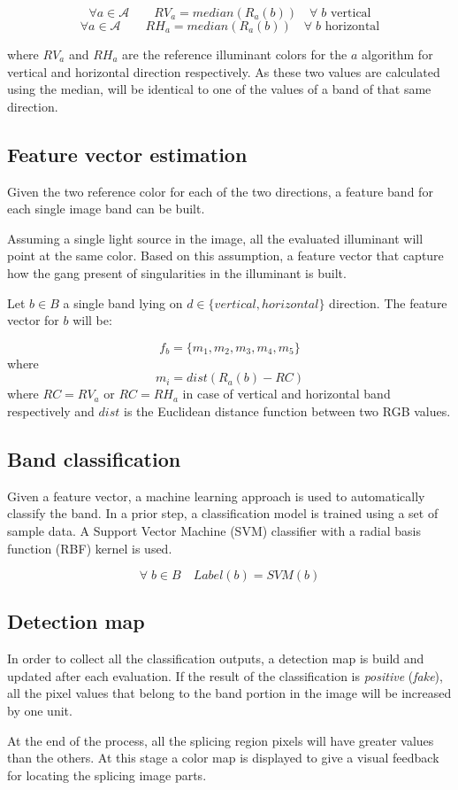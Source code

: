 $$
\forall a \in \mathcal{A} \qquad RV_a = median(R_a(b)) \quad \forall \; b \textrm{ vertical}
$$
$$
\forall a \in \mathcal{A} \qquad RH_a = median(R_a(b)) \quad \forall \; b \textrm{ horizontal}
$$

where $RV_a$ and $RH_a$ are the reference illuminant colors for the $a$ algorithm for vertical and horizontal direction respectively. As these two values are calculated using the median, will be identical to one of the values of a band of that same direction.

\subsection{Feature vector estimation}

Given the two reference color for each of the two directions, a feature band for each single image band can be built.

Assuming a single light source in the image, all the evaluated illuminant will point at the same color.
Based on this assumption, a feature vector that capture how the gang present of singularities in the illuminant is built.

Let $b \in B$ a single band lying on $d \in \{vertical, horizontal\}$ direction. The feature vector for $b$ will be:

\begin{equation}\label{eq:regionsfeaturevector}
f_{b} = \{m_1, m_2, m_3, m_4, m_5\}
\end{equation}
where
$$
m_i = dist(R_a(b) - RC)
$$
where $RC = RV_a$ or $RC = RH_a$ in case of vertical and horizontal band respectively and $dist$ is the Euclidean distance function between two RGB values.

\subsection{Band classification}

Given a feature vector, a machine learning approach is used to automatically classify the band. 
In a prior step, a classification model is trained using a set of sample data. A Support Vector Machine (SVM) classifier with a radial basis function (RBF) kernel is used.

$$
\forall \; b \in B \quad Label(b) = SVM(b)
$$

\subsection{Detection map}

In order to collect all the classification outputs, a detection map is build and updated after each evaluation. If the result of the classification is \emph{positive} (\emph{fake}), all the pixel values that belong to the band portion in the image will be increased by one unit.

At the end of the process, all the splicing region pixels will have greater values than the others. At this stage a color map is displayed to give a visual feedback for locating the splicing image parts.


